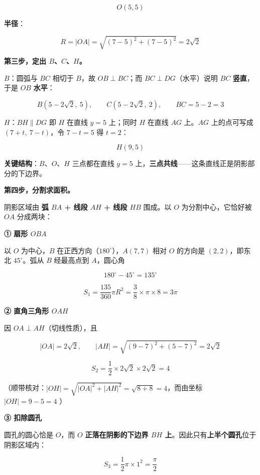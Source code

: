 \begin{answer}
\nopagebreak[4]
\[\boxed{O(5,5)}\]

\textbf{半径}：

\nopagebreak[4]
\[R=|OA|=\sqrt{(7-5)^{2}+(7-5)^{2}}=2\sqrt2\]

\textbf{第三步，定出 $B$、$C$、$H$。}

\textbf{$B$}：圆弧与 $BC$ 相切于 $B$，故 $OB\perp BC$；而 $BC\perp DG$（水平）说明 $BC$ \textbf{竖直}，于是 $OB$ \textbf{水平}：

\nopagebreak[4]
\[B\left(5-2\sqrt2,\ 5\right),\qquad C\left(5-2\sqrt2,\ 2\right),\qquad BC=5-2=3\]

\textbf{$H$}：$BH\parallel DG$ 即 $H$ 在直线 $y=5$ 上；同时 $H$ 在直线 $AG$ 上。$AG$ 上的点可写成 $(7+t,\ 7-t)$，令 $7-t=5$ 得 $t=2$：

\nopagebreak[4]
\[H(9,5)\]

\textbf{关键结构}：$B$、$O$、$H$ 三点都在直线 $y=5$ 上，\textbf{三点共线}——这条直线正是阴影部分的下边界。

\textbf{第四步，分割求面积。}

阴影区域由 \textbf{弧 $BA$ + 线段 $AH$ + 线段 $HB$} 围成。以 $O$ 为分割中心，它恰好被 $OA$ 分成两块：

\textbf{① 扇形 $OBA$}

以 $O$ 为中心，$B$ 在正西方向（$180^\circ$），$A(7,7)$ 相对 $O$ 的方向是 $(2,2)$，即东北 $45^\circ$。弧从 $B$ 经最高点到 $A$，圆心角

\nopagebreak[4]
\[180^\circ-45^\circ=135^\circ\]

\nopagebreak[4]
\[S_1=\frac{135}{360}\pi R^{2}=\frac38\times\pi\times8=3\pi\]

\textbf{② 直角三角形 $OAH$}

因 $OA\perp AH$（切线性质），且

\nopagebreak[4]
\[|OA|=2\sqrt2,\qquad |AH|=\sqrt{(9-7)^{2}+(5-7)^{2}}=2\sqrt2\]

\nopagebreak[4]
\[S_2=\frac12\times2\sqrt2\times2\sqrt2=4\]

（顺带核对：$|OH|=\sqrt{|OA|^{2}+|AH|^{2}}=\sqrt{8+8}=4$，而由坐标 $|OH|=9-5=4$ ）

\textbf{③ 扣除圆孔}

圆孔的圆心恰是 $O$，而 $O$ \textbf{正落在阴影的下边界 $BH$ 上}。因此只有\textbf{上半个圆孔}位于阴影区域内：

\nopagebreak[4]
\[S_3=\frac12\pi\times1^{2}=\frac\pi2\]


\end{answer}
